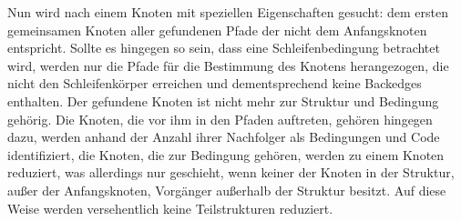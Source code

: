 \documentclass[11pt]{article} %
\begin{document}
\begin{multicols}{2}
\begin{enumerate}
Nun wird nach einem Knoten mit speziellen Eigenschaften gesucht: dem ersten gemeinsamen Knoten aller gefundenen Pfade der nicht dem Anfangsknoten entspricht. Sollte es hingegen so sein, dass eine Schleifenbedingung betrachtet wird, werden nur die Pfade für die Bestimmung des Knotens herangezogen, die nicht den Schleifenkörper erreichen und dementsprechend keine Backedges enthalten. Der gefundene Knoten ist nicht mehr zur Struktur und Bedingung gehörig. Die Knoten, die vor ihm in den Pfaden auftreten, gehören hingegen dazu, werden anhand der Anzahl ihrer Nachfolger als Bedingungen und Code identifiziert, die Knoten, die zur Bedingung gehören, werden zu einem Knoten reduziert, was allerdings nur geschieht, wenn keiner der Knoten in der Struktur, außer der Anfangsknoten, Vorgänger außerhalb der Struktur besitzt. Auf diese Weise werden versehentlich keine Teilstrukturen reduziert.
\end{enumerate}


\end{multicols}
\end{document}
